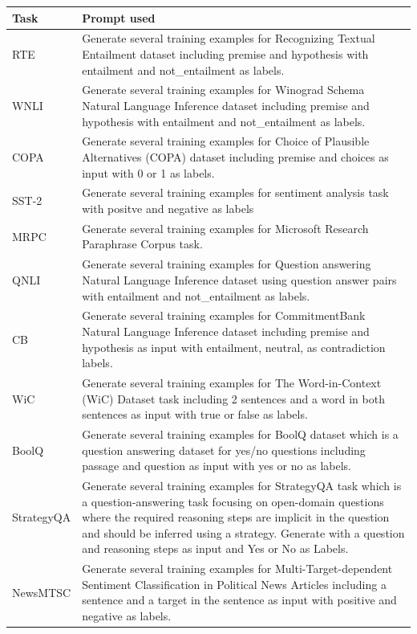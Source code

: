 \documentclass[letterpaper]{article} %
\begin{document}
\begin{table}[h!]
\begin{tabular}{l|p{5.5in}}
Task &
  Prompt used \\ \hline \hline
RTE &
  Generate several training examples for Recognizing Textual Entailment dataset including premise and hypothesis with entailment and not\_entailment as labels. \\ \hline
WNLI &
  Generate several training examples for Winograd Schema Natural Language Inference dataset including premise and hypothesis with entailment and not\_entailment as labels.   \\ \hline
COPA &
  Generate several training examples for Choice of Plausible Alternatives (COPA) dataset including premise and choices as input with 0 or 1 as labels. \\ \hline
SST-2 &
  Generate several training examples for sentiment analysis task with positve and negative as labels \\ \hline
MRPC &
  Generate several training examples for Microsoft Research Paraphrase Corpus task. \\ \hline
QNLI &
  Generate several training examples for Question answering  Natural Language Inference dataset using question answer pairs with entailment and not\_entailment as labels.   \\ \hline
CB &
  Generate several training examples for CommitmentBank Natural Language Inference dataset including premise and hypothesis as input with entailment, neutral, as contradiction labels.  \\ \hline
WiC &
  Generate several training examples for The Word-in-Context (WiC) Dataset task including 2 sentences and a word in both sentences as input with true or false as labels.   \\ \hline
BoolQ &
  Generate several training examples for BoolQ dataset which is a question answering dataset for yes/no questions including passage and question as input with yes or no as labels.  \\ \hline \hline
StrategyQA &
  Generate several training examples for StrategyQA task which is a question-answering task focusing on open-domain questions where the required reasoning steps are implicit in the question and should be inferred using a strategy.  Generate with a question and reasoning steps as input and Yes or No as Labels.  \\ \hline
NewsMTSC &
  Generate several training examples for Multi-Target-dependent Sentiment Classification in Political News Articles including a sentence and a target in the sentence as input with positive and negative as labels.  \\ \hline

\end{tabular}
\end{table}
\end{document}
